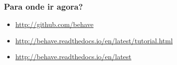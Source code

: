 
\begin{frame}
    \frametitle{Para onde ir agora?}
    \begin{itemize}
        \item \url{http://github.com/behave}
        \item {\small\url{http://behave.readthedocs.io/en/latest/tutorial.html}}
        \item \url{http://behave.readthedocs.io/en/latest}
    \end{itemize}
\end{frame}



